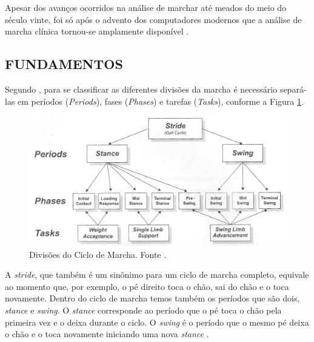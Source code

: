 Apesar dos avanços ocorridos na análise de marchar até meados do meio do século vinte, foi só após o advento dos computadores modernos que a análise de marcha clínica tornou-se amplamente disponível \cite{Baker2007}.



\subsection{FUNDAMENTOS}
Segundo , para se classificar as diferentes divisões da marcha é necessário separá-las em períodos (\emph{Periods}), fases (\emph{Phases}) e tarefas (\emph{Tasks}), conforme a Figura \ref{fases_marcha}.

\begin{figure}[ht]
	\centering
	\includegraphics[width=15cm]{figuras/fases_marcha.eps}
	\caption{Divisões do Ciclo de Marcha. Fonte \cite{Perry2010}.}
	\label{fases_marcha}
\end{figure}

A \emph{stride}, que também é um sinônimo para um ciclo de marcha completo, equivale ao momento que, por exemplo, o pé direito toca o chão, sai do chão e o toca novamente. Dentro do ciclo de marcha temos também os períodos que são dois, \emph{stance} e \emph{swing}. 
O \emph{stance} corresponde ao período que o pé toca o chão pela primeira vez e o deixa durante o ciclo. 
O \emph{swing} é o período que o mesmo pé deixa o chão e o toca novamente iniciando uma nova \emph{stance} \cite{Perry2010}. 

